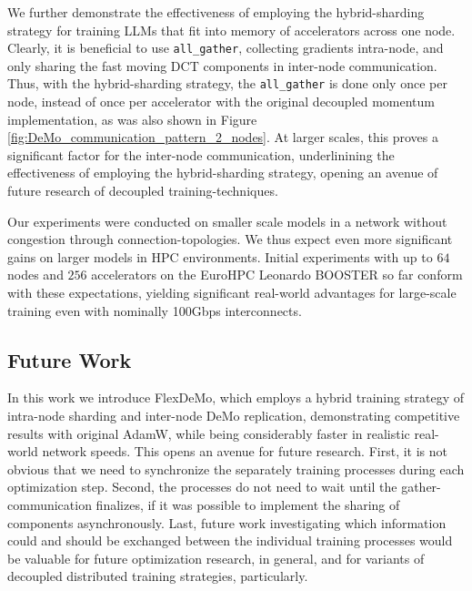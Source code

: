 We further demonstrate the effectiveness of employing the hybrid-sharding strategy for training LLMs that fit into memory of accelerators across one node. Clearly, it is beneficial to use \texttt{all\_gather}, collecting gradients intra-node, and only sharing the fast moving DCT components in inter-node communication. Thus, with the hybrid-sharding strategy, the \texttt{all\_gather} is done only once per node, instead of once per accelerator with the original decoupled momentum implementation, as was also shown in Figure \ref{fig:DeMo_communication_pattern_2_nodes}. At larger scales, this proves a significant factor for the inter-node communication, underlinining the effectiveness of employing the hybrid-sharding strategy, opening an avenue of future research of decoupled training-techniques.

Our experiments were conducted on smaller scale models in a network without congestion through connection-topologies. We thus expect even more significant gains on larger models in HPC environments. Initial experiments with up to $64$ nodes and $256$ accelerators on the EuroHPC Leonardo BOOSTER so far conform with these expectations, yielding significant real-world advantages for large-scale training even with nominally 100Gbps interconnects.


\subsection{Future Work}
In this work we introduce FlexDeMo, which employs a hybrid training strategy of intra-node sharding and inter-node DeMo replication, demonstrating competitive results with original AdamW, while being considerably faster in realistic real-world network speeds. This opens an avenue for future research. First, it is not obvious that we need to synchronize the separately training processes during each optimization step. Second, the processes do not need to wait until the gather-communication finalizes, if it was possible to implement the sharing of components asynchronously. Last, future work investigating which information could and should be exchanged between the individual training processes would be valuable for future optimization research, in general, and for variants of decoupled distributed training strategies, particularly.

